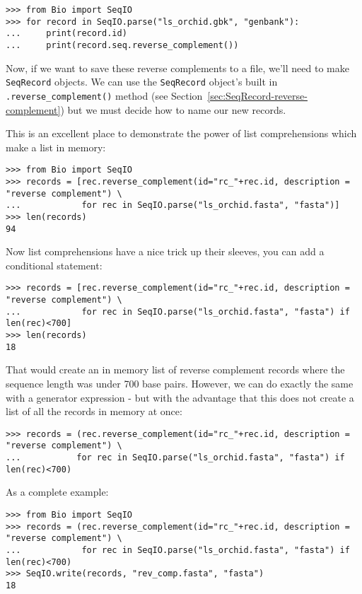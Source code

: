 \begin{verbatim}
>>> from Bio import SeqIO
>>> for record in SeqIO.parse("ls_orchid.gbk", "genbank"):
...     print(record.id)
...     print(record.seq.reverse_complement())
\end{verbatim}

Now, if we want to save these reverse complements to a file, we'll need to make \verb|SeqRecord| objects.
We can use  the \verb|SeqRecord| object's built in \verb|.reverse_complement()| method (see Section~\ref{sec:SeqRecord-reverse-complement}) but we must decide how to name our new records.

This is an excellent place to demonstrate the power of list comprehensions which make a list in memory:
\begin{verbatim}
>>> from Bio import SeqIO
>>> records = [rec.reverse_complement(id="rc_"+rec.id, description = "reverse complement") \
...            for rec in SeqIO.parse("ls_orchid.fasta", "fasta")]
>>> len(records)
94
\end{verbatim}

\noindent Now list comprehensions have a nice trick up their sleeves, you can add a conditional statement:

\begin{verbatim}
>>> records = [rec.reverse_complement(id="rc_"+rec.id, description = "reverse complement") \
...            for rec in SeqIO.parse("ls_orchid.fasta", "fasta") if len(rec)<700]
>>> len(records)
18
\end{verbatim}

That would create an in memory list of reverse complement records where the sequence length was under 700 base pairs. However, we can do exactly the same with a generator expression - but with the advantage that this does not create a list of all the records in memory at once:

\begin{verbatim}
>>> records = (rec.reverse_complement(id="rc_"+rec.id, description = "reverse complement") \
...           for rec in SeqIO.parse("ls_orchid.fasta", "fasta") if len(rec)<700)
\end{verbatim}

As a complete example:

\begin{verbatim}
>>> from Bio import SeqIO
>>> records = (rec.reverse_complement(id="rc_"+rec.id, description = "reverse complement") \
...            for rec in SeqIO.parse("ls_orchid.fasta", "fasta") if len(rec)<700)
>>> SeqIO.write(records, "rev_comp.fasta", "fasta")
18
\end{verbatim}

